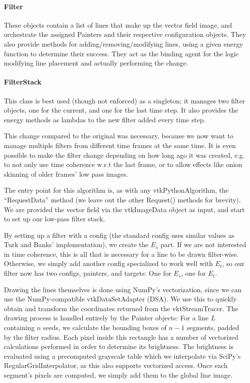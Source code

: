 \paragraph*{Filter} These objects contain a list of lines that make up the vector field image,
and orchestrate the assigned Painters and their respective configuration objects.
They also provide methods for adding/removing/modifying lines,
using a given energy function to determine their success.
They act as the binding agent for the logic modifying line placement and actually performing the change.
\paragraph*{FilterStack} This class is best used (though not enforced) as a singleton;
it manages two filter objects, one for the current,  and one for the last time step.
It also provides the energy methods as lambdas to the new filter added every time step.

This change compared to the original was necessary,
because we now want to manage multiple filters from different time frames at the same time.
It is even possible to make the filter change depending on how long ago it was created,
e.g. to not only use time coherence w.r.t the last frame,
or to allow effects like onion skinning of older frames' low pass images.

The entry point for this algorithm is, as with any vtkPythonAlgorithm,
the ``RequestData'' method (we leave out the other Request() methods for brevity).
We are provided the vector field via the vtkImageData object as input,
and start to set up our low-pass filter stack.

By setting up a filter with a config
(the standard config uses similar values as Turk and Banks' implementation), we create the $E_s$ part.
If we are not interested in time coherence,
this is all that is necessary for a line to be drawn filter-wise.
Otherwise, we simply add another config specialized to work well with $E_t$,
so our filter now has two configs, painters, and targets: One for $E_s$, one for $E_t$.

Drawing the lines themselves is done using NumPy's vectorization,
since we can use the NumPy-compatible vtkDataSetAdapter (DSA).
We use this to quickly obtain and transform the coordinates returned from the vktStreamTracer.
The drawing process is handled entirely by the Painter objects:
For a line $L$ containing $n$ seeds, we calculate the bounding boxes of $n-1$ segments,
padded by the filter radius.
Each pixel inside this rectangle has a number of vectorized calculations
performed in order to determine its brightness.
The brightness is evaluated using a precomputed grayscale table which we
interpolate via SciPy's RegularGridInterpolator, as this also supports vectorized access.
Once each segment's pixels are computed, we simply add them to the global line image.

